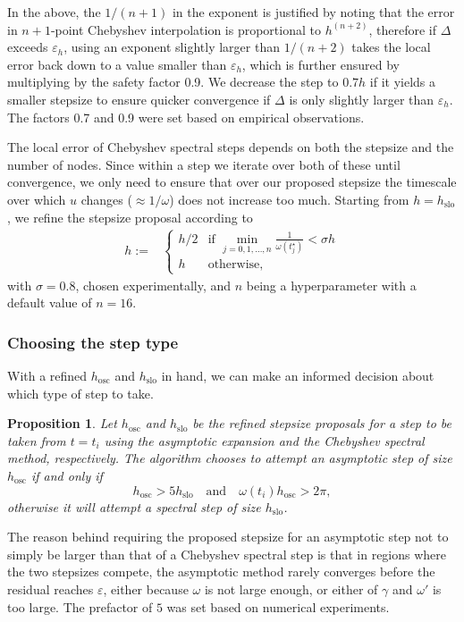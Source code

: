 \documentclass[10pt]{article}
\newtheorem{pro}[thm]{Proposition}
\newcommand{\om}{\omega}
\newcommand{\g}{\gamma}
\begin{document}
In the above, the $1/(n+1)$ in the exponent is justified by noting that the
error in $n+1$-point Chebyshev interpolation is proportional to $h^(n+2)$, therefore if
$\Delta$ exceeds $\varepsilon_h$, using an exponent slightly larger than $1/(n+2)$ takes
the local error back down to a value smaller than $\varepsilon_h$, which is further
ensured by multiplying by the safety factor 0.9. We decrease the step to $0.7h$
if it yields a smaller stepsize to ensure quicker convergence if $\Delta$ is
only slightly larger than $\varepsilon_h$. The factors 0.7 and 0.9 were set based on
empirical observations. 

The local error of Chebyshev spectral steps depends on both the stepsize and
the number of nodes. Since within a step we iterate over both of these until
convergence, we only need to ensure that over our proposed stepsize the
timescale over which $u$ changes ($\approx 1/\om$) does not increase too much. Starting from $h =
h_{\text{slo}}$, we refine the stepsize proposal according to
\begin{align}
    h :=& \begin{cases}
        h/2 &\text{if } \min\limits_{j = 0, 1, \ldots, n}\frac{1}{\om(t^{\star}_j)} < \sigma h \\
        h &\text{otherwise},
    \end{cases}
\end{align}
with $\sigma = 0.8$, chosen experimentally, and $n$ being a hyperparameter with a default value of $n = 16$.

\subsubsection{Choosing the step type}
\label{s:steptype}

With a refined $h_{\text{osc}}$ and $h_{\text{slo}}$ in hand, we can make an informed decision about which type of step to take.
\begin{pro}\label{steptypechoose}
    Let $h_{\text{osc}}$ and $h_{\text{slo}}$ be the refined stepsize proposals
    for a step to be taken from $t = t_i$ using the asymptotic expansion and the Chebyshev
    spectral method, respectively. The algorithm chooses to attempt an
    asymptotic step of size $h_{\text{osc}}$ if and only if
$$ h_{\text{osc}} > 5h_{\text{slo}} \quad \text{and} \quad \omega(t_i) h_{\text{osc}} > 2\pi, $$
    otherwise it will attempt a spectral step of size $h_{\text{slo}}$.
\end{pro}
The reason behind requiring the proposed stepsize for an asymptotic step not to
simply be larger than that of a Chebyshev spectral step is that in regions
where the two stepsizes compete, the asymptotic method rarely converges before
the residual reaches $\varepsilon$, either because $\om$ is not large enough, or
either of $\g$ and $\om'$ is too large. The prefactor of $5$ was set based on numerical experiments. 
\end{document}

